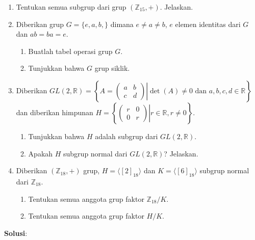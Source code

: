 \documentclass[10pt,openany,a4paper]{article}
\newcommand{\R}{\mathbb{R}}
\newcommand{\Z}{\mathbb{Z}}
\newcommand{\jawab}{\large\textbf{Solusi}:}
\begin{document}
\begin{enumerate}
    \item Tentukan semua subgrup dari grup $(\Z_{15}, +)$. Jelaskan.
    \item Diberikan grup $G = \{e, a, b, \}$ dimana $e\ne a\ne b$, $e$ elemen identitas dari $G$ dan $ab=ba=e$.
    \begin{enumerate}
        \item Buatlah tabel operasi grup $G$.
        \item Tunjukkan bahwa $G$ grup siklik.
    \end{enumerate}
    \item Diberikan $GL(2,\R)=\left\{A=\left.\begin{pmatrix} a & b \\ c & d \end{pmatrix} \right| \det(A)\ne 0 \text{ dan } a,b,c,d\in\R\right\}$ dan diberikan himpunan $H=\left\{\left.\begin{pmatrix} r & 0 \\ 0 & r \end{pmatrix} \right| r\in\R, r\ne 0\right\}$.
    \begin{enumerate}
        \item Tunjukkan bahwa $H$ adalah subgrup dari $GL(2,\R)$.
        \item Apakah $H$ subgrup normal dari $GL(2,\R)$? Jelaskan.
    \end{enumerate}
    \item Diberikan $(\Z_{18},+)$ grup, $H=\langle [2]_{18}\rangle$ dan $K=\langle [6]_{18}\rangle$ subgrup normal dari $\Z_{18}$.
    \begin{enumerate}
        \item Tentukan semua anggota grup faktor $\Z_{18}/K$.
        \item Tentukan semua anggota grup faktor $H/K$.
    \end{enumerate}
\end{enumerate}

\newpage
\jawab

\end{document}
